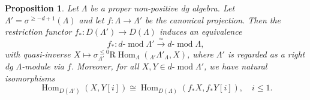 \documentclass[11pt,a4paper,reqno]{amsart}
\theoremstyle{plain}
\newtheorem{proposition}[theorem]{Proposition}
\numberwithin{equation}{section}
\theoremstyle{definition}
\renewcommand{\mod}{\operatorname{mod}}
\newcommand{\Hom}{\operatorname{Hom}}
\newcommand{\RHom}{\mathrm R\!\Hom}
\newcommand{\emod}[2]{#1\text{-}\!\mod #2}
\begin{document}
\begin{proposition}\label{prop:trun-equiv} 
  Let $\Lambda$ be a proper non-positive dg algebra. Let $\Lambda'=\sigma^{\geq -d+1}(\Lambda)$ and let $f\colon \Lambda\to\Lambda'$ be the canonical projection. Then the restriction functor $f_*\colon D(\Lambda')\to D(\Lambda)$ induces an equivalence
  \[
  f_*\colon\emod{d}{\Lambda'}\xrightarrow{\simeq}\emod{d}{\Lambda},
  \]
  with quasi-inverse $X\mapsto\sigma_{\Lambda'}^{\leq0}\RHom_\Lambda({}_{\Lambda'}\Lambda'_\Lambda,X)$, where $\Lambda'$ is regarded as a right dg $\Lambda$-module via $f$. Moreover, for all $X,Y\in\emod{d}{\Lambda'}$, we have natural isomorphisms
  \begin{equation}\label{eq:isoleq1}
    \Hom_{D(\Lambda')}(X,Y[i])\cong\Hom_{D(\Lambda)}(f_*X,f_*Y[i]),\quad i\leq 1.
  \end{equation}
\end{proposition}
\end{document}
